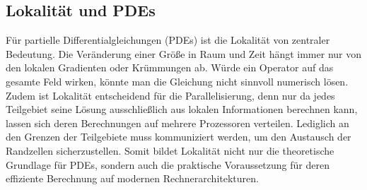 \subsection{Lokalität und PDEs
\label{parallelisierung:sub:LokalitaetPDE}}
Für partielle Differentialgleichungen (PDEs) ist die Lokalität von zentraler Bedeutung. 
Die Veränderung einer Größe in Raum und Zeit hängt immer nur von den lokalen Gradienten oder Krümmungen ab. 
Würde ein Operator auf das gesamte Feld wirken, könnte man die Gleichung nicht sinnvoll numerisch lösen. 
Zudem ist Lokalität entscheidend für die Parallelisierung, denn nur da jedes Teilgebiet seine Lösung ausschließlich aus lokalen Informationen berechnen kann, lassen sich deren Berechnungen auf mehrere Prozessoren verteilen. 
Lediglich an den Grenzen der Teilgebiete muss kommuniziert werden, um den Austausch der Randzellen sicherzustellen. 
Somit bildet Lokalität nicht nur die theoretische Grundlage für PDEs, sondern auch die praktische Voraussetzung für deren effiziente Berechnung auf modernen Rechnerarchitekturen.

